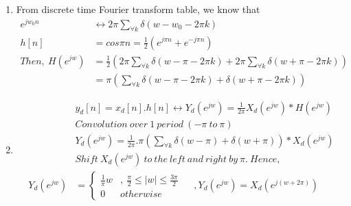 \documentclass[10pt,a4paper, margin=1in]{article}
\begin{document}
\begin{enumerate}
\begin{enumerate}
    \item %
    From discrete time Fourier transform table, we know that
    \begin{align*}
    e^{jw_0n} & \longleftrightarrow 2\pi \sum_{\forall k} \delta(w-w_0-2\pi k) \\
    h[n] &= cos\pi n = \frac{1}{2} (e^{j\pi n} + e^{-j\pi n}) \\
    Then, \ H(e^{jw}) &= \frac{1}{2} (2\pi \sum_{\forall k} \delta(w-\pi-2\pi k) + 2\pi \sum_{\forall k} \delta(w+\pi-2\pi k)) \\
    &= \pi (\sum_{\forall k} \delta(w-\pi-2\pi k) + \delta(w+\pi-2\pi k))
    \end{align*}
    \item %
    \begin{align*}
    &y_d[n] = x_d[n].h[n] \longleftrightarrow Y_d(e^{jw}) = \frac{1}{2\pi} X_d(e^{jw})*H(e^{jw}) \\
    &Convolution \ over \ 1 \ period \ (-\pi \ to \ \pi) \\
    &Y_d(e^{jw}) = \frac{1}{2\pi}.\pi (\sum_{\forall k} \delta(w-\pi) + \delta(w+\pi))\ast X_d(e^{jw}) \\
    &Shift \ X_d(e^{jw}) \ to \ the \ left \ and \ right \ by \ \pi. \ Hence, \\    
    Y_d(e^{jw}) &= 
    \begin{cases} 
      \frac{1}{\pi}w & , \ \frac{\pi}{2} \leq | w | \leq \frac{3\pi}{2} \\
      0 & otherwise
    \end{cases} \quad \ ,Y_d(e^{jw}) = X_d(e^{j(w+2\pi)})
    \end{align*}
    \end{enumerate}


\end{enumerate}
\end{document}

